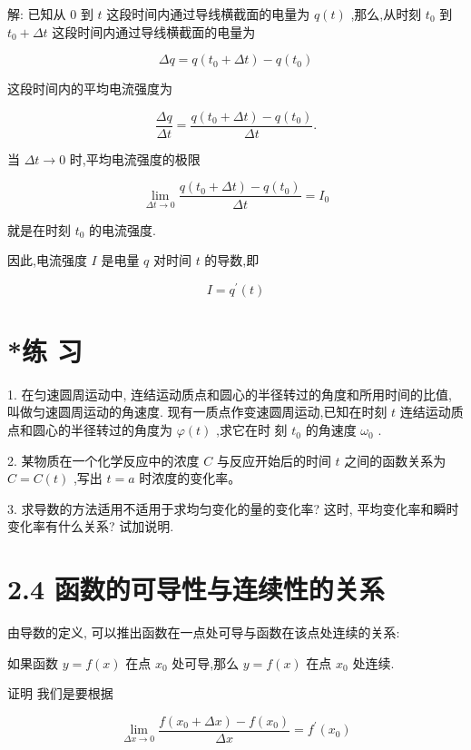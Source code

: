 \documentclass[10pt]{article}
\begin{document}
解: 已知从 0 到 \(t\) 这段时间内通过导线横截面的电量为 \(q\left( t\right)\) ,那么,从时刻 \({t}_{0}\) 到 \({t}_{0} + {\Delta t}\) 这段时间内通过导线横截面的电量为

\[
{\Delta q} = q\left( {{t}_{0} + {\Delta t}}\right) - q\left( {t}_{0}\right)
\]

这段时间内的平均电流强度为

\[
\frac{\Delta q}{\Delta t} = \frac{q\left( {{t}_{0} + {\Delta t}}\right) - q\left( {t}_{0}\right) }{\Delta t}.
\]

当 \({\Delta t} \rightarrow 0\) 时,平均电流强度的极限

\[
\mathop{\lim }\limits_{{{\Delta t} \rightarrow 0}}\frac{q\left( {{t}_{0} + {\Delta t}}\right) - q\left( {t}_{0}\right) }{\Delta t} = {I}_{0}
\]

就是在时刻 \({t}_{0}\) 的电流强度.

因此,电流强度 \(I\) 是电量 \(q\) 对时间 \(t\) 的导数,即

\[
I = {q}^{\prime }\left( t\right)
\]

\section*{*练 习}

1. 在匀速圆周运动中, 连结运动质点和圆心的半径转过的角度和所用时间的比值, 叫做匀速圆周运动的角速度. 现有一质点作变速圆周运动,已知在时刻 \(t\) 连结运动质点和圆心的半径转过的角度为 \(\varphi \left( t\right)\) ,求它在时 刻 \({t}_{0}\) 的角速度 \({\omega }_{0}\) .

2. 某物质在一个化学反应中的浓度 \(C\) 与反应开始后的时间 \(t\) 之间的函数关系为 \(C = C\left( t\right)\) ,写出 \(t = a\) 时浓度的变化率。

3. 求导数的方法适用不适用于求均匀变化的量的变化率? 这时, 平均变化率和瞬时变化率有什么关系? 试加说明.

\section*{2.4 函数的可导性与连续性的关系}

由导数的定义, 可以推出函数在一点处可导与函数在该点处连续的关系:

如果函数 \(y = f\left( x\right)\) 在点 \({x}_{0}\) 处可导,那么 \(y = f\left( x\right)\) 在点 \({x}_{0}\) 处连续.

证明 我们是要根据

\[
\mathop{\lim }\limits_{{{\Delta x} \rightarrow 0}}\frac{f\left( {{x}_{0} + {\Delta x}}\right) - f\left( {x}_{0}\right) }{\Delta x} = {f}^{\prime }\left( {x}_{0}\right)
\]
\end{document}

